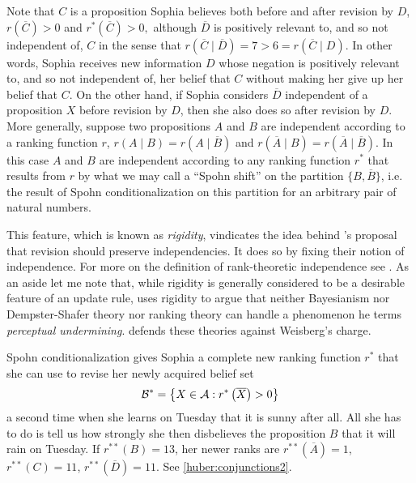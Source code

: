 Note that $C$ is a proposition Sophia believes both before and after revision by $D$, $r(\overline{C})>0$
and $r^*(\overline{C})>0,$ although $\overline{D}$ is positively relevant to, and so not independent of, $C$ in the sense that $r(\overline{C}\mid\overline{D})=7>6=r(\overline{C}\mid D).$ In other words, Sophia receives new information $D$ whose negation is positively relevant to, and so not independent of, her belief that $C$ without making her give up her belief that $C$. On the other hand, if Sophia considers $\overline{D}$ independent of a proposition $X$ before revision by $D$, %
then she also does so after revision by $D$. %
More generally, suppose two propositions $A$ and $B$ are independent according to a ranking function $r$,
$r(A\mid B)=r(A\mid\overline{B})$ and $r(\overline{A}\mid B)=r(\overline{A}\mid\overline{B})$. In this case $A$ and $B$ are independent according to any ranking function $r^*$ that results from $r$ by what we may call a ``Spohn shift'' on the partition $\{B,\overline{B}\}$, i.e. the result of Spohn conditionalization on this partition for an arbitrary pair of natural numbers.

This feature, which is known as \emph{rigidity}, vindicates the idea behind \citet{jt07}'s proposal that revision should preserve independencies. It does so by fixing their notion of independence. For more on the definition of rank-theoretic independence see \citet{s99}. As an aside let me note that, while rigidity is generally considered to be a desirable feature of an update rule, \citet{w09, w15} uses rigidity to argue that neither Bayesianism nor Dempster-Shafer theory \citep{h09} nor ranking theory can handle a phenomenon he terms \emph{perceptual undermining}. \citet{h14a} defends these theories against Weisberg's charge.

Spohn conditionalization gives Sophia a complete new ranking function $r^*$ that she can use to revise her newly acquired belief set
$$\begin{cal}B\end{cal}^*=\left\{X\in\begin{cal}A\end{cal}: r^*\left(\overline{X}\right)>0\right\}$$
a second time when she learns on Tuesday that it is sunny after all. All she has to do is tell us how strongly she then disbelieves the proposition $B$ that it will rain on Tuesday. If $r^{**}\left(B\right)=13$, her newer ranks are $r^{**}(\overline{A})=1$, $r^{**}(C)=11$, $r^{**}(\overline{D})=11$. See \autoref{huber:conjunctions2}.

